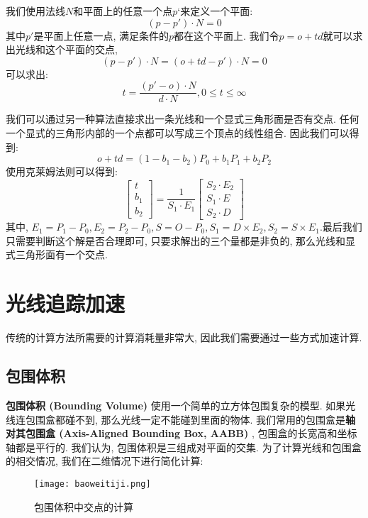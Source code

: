 \documentclass[openany]{progbookcn}
\begin{document}
我们使用法线$N$和平面上的任意一个点$p‘$来定义一个平面: 
\begin{equation}
	(p-p')\cdot N = 0
\end{equation}
其中$p'$是平面上任意一点, 满足条件的$p$都在这个平面上. 我们令$p=o+td$就可以求出光线和这个平面的交点, 
\begin{equation}
	(p-p')\cdot N = (o+td-p')\cdot N = 0
\end{equation}
可以求出: 
\begin{equation}
	t = \frac{(p'-o)\cdot N}{d\cdot N}, 0\le t \le \infty
\end{equation}

我们可以通过另一种算法直接求出一条光线和一个显式三角形面是否有交点. 任何一个显式的三角形内部的一个点都可以写成三个顶点的线性组合. 因此我们可以得到: 
\begin{equation}
	o+td=(1-b_1-b_2)P_0+b_1P_1+b_2P_2
\end{equation}使用克莱姆法则可以得到: 
\begin{equation}
	\begin{bmatrix}
		t\\ 
		b_1\\ 
		b_2
	\end{bmatrix}=\frac{1}{S_1\cdot E_1}\begin{bmatrix}
		S_2\cdot E_2\\ 
		S_1\cdot E\\ 
		S_2\cdot D
	\end{bmatrix}
\end{equation}其中, $E_1=P_1-P_0,E_2=P_2-P_0,S=O-P_0,S_1=D\times E_2, S_2=S\times E_1$.最后我们只需要判断这个解是否合理即可, 只要求解出的三个量都是非负的, 那么光线和显式三角形面有一个交点. 

\section{光线追踪加速}
传统的计算方法所需要的计算消耗量非常大, 因此我们需要通过一些方式加速计算. 
\subsection{包围体积}
\textbf{包围体积 (Bounding Volume) }使用一个简单的立方体包围复杂的模型. 如果光线连包围盒都碰不到, 那么光线一定不能碰到里面的物体. 
我们常用的包围盒是\textbf{轴对其包围盒 (Axis-Aligned Bounding Box,  AABB) }, 包围盒的长宽高和坐标轴都是平行的. 我们认为, 包围体积是三组成对平面的交集. 为了计算光线和包围盒的相交情况, 我们在二维情况下进行简化计算: 
\begin{figure}[H]
	\centering
	\texttt{[image: baoweitiji.png]}
	\caption{包围体积中交点的计算}
	\label{fig:bwtj}
\end{figure}
\end{document}
